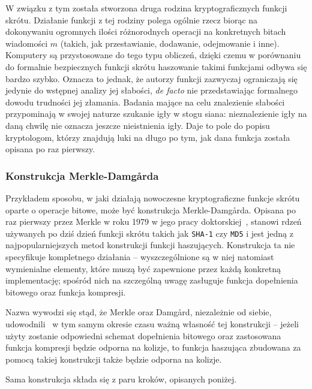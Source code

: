 \documentclass[12pt,a4paper,twoside]{article}
\begin{document}
W związku z tym została stworzona druga rodzina kryptograficznych funkcji
skrótu. Działanie funkcji z tej rodziny polega ogólnie rzecz biorąc na
dokonywaniu ogromnych ilości różnorodnych operacji na konkretnych bitach
wiadomości $m$ (takich, jak przestawianie, dodawanie, odejmowanie i inne).
Komputery są przystosowane do tego typu obliczeń, dzięki czemu w porównaniu do
formalnie bezpiecznych funkcji skrótu haszowanie takimi funkcjami odbywa się
bardzo szybko. Oznacza to jednak, że autorzy funkcji zazwyczaj ograniczają się
jedynie do wstępnej analizy jej słabości, \textit{de facto} nie przedstawiając
formalnego dowodu trudności jej złamania. Badania mające na celu znalezienie
słabości przypominają w swojej naturze szukanie igły w stogu siana:
nieznalezienie igły na daną chwilę nie oznacza jeszcze nieistnienia igły. Daje
to pole do popisu kryptologom, którzy znajdują luki na długo po tym, jak dana
funkcja została opisana po raz pierwszy.

\subsubsection{Konstrukcja Merkle-Damg\r{a}rda}
Przykładem sposobu, w jaki działają nowoczesne kryptograficzne funkcje skrótu
oparte o operacje bitowe, może być konstrukcja Merkle-Damg\r{a}rda. Opisana po
raz pierwszy przez Merkle w roku 1979 w jego pracy
doktorskiej~\cite{merkle_damgard_construction}, stanowi rdzeń używanych po dziś
dzień funkcji skrótu takich jak \texttt{SHA-1} czy \texttt{MD5} i jest jedną z
najpopularniejszych metod konstrukcji funkcji haszujących. Konstrukcja ta
nie specyfikuje kompletnego działania -- wyszczególnione są w niej natomiast
wymienialne elementy, które muszą być zapewnione przez każdą konkretną
implementację; spośród nich na szczególną uwagę zasługuje funkcja dopełnienia
bitowego oraz funkcja kompresji.

Nazwa wywodzi się stąd, że Merkle oraz Damg\r{a}rd, niezależnie od siebie,
udowodnili~\cite{merkle_damgard_security1,merkle_damgard_security2} w tym samym
okresie czasu ważną własność tej konstrukcji -- jeżeli użyty zostanie
odpowiedni schemat dopełnienia bitowego oraz zastosowana funkcja kompresji
będzie odporna na kolizje, to funkcja haszująca zbudowana za pomocą takiej
konstrukcji także będzie odporna na kolizje.

Sama konstrukcja składa się z paru kroków, opisanych poniżej.
\end{document}
